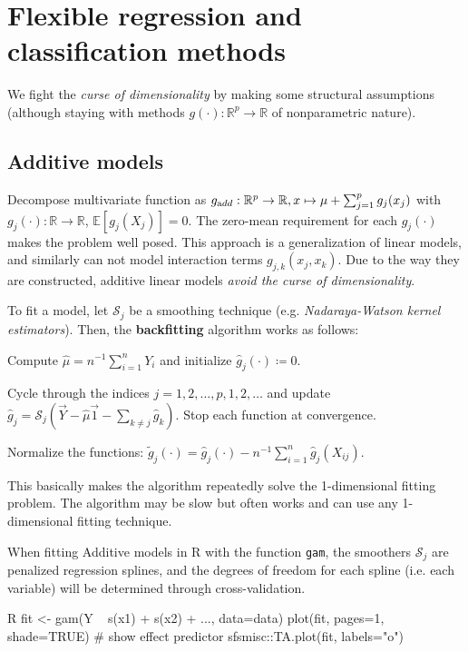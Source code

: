 \section{\Large Flexible regression and classification methods}\label{sec:flexible_regression_and_classification_methods}
We fight the \emph{curse of dimensionality} by making some structural assumptions (although staying with methods $g(\cdot): \mathbb{R}^p \to \mathbb{R}$ of nonparametric nature).
\subsection{Additive models}%
\label{sub:additive_models}
\begin{sectionbox}\nospacing{}
  Decompose multivariate function as $g_{\textrm add}: \mathbb{R}^p\to\mathbb{R}, x\mapsto \mu + \sum_{j=1}^pg_j(x_j)$ with $g_j(\cdot): \mathbb{R}\to\mathbb{R}$, $\mathbb{E}[g_j(X_j)]=0$.
  The zero-mean requirement for each $g_j(\cdot)$ makes the problem well posed.
  This approach is a generalization of linear models, and similarly can not model interaction terms $g_{j,k}(x_j, x_k)$.
  Due to the way they are constructed, additive linear models \emph{avoid the curse of dimensionality}.
\end{sectionbox}
\begin{sectionbox}\nospacing{}
  To fit a model, let $\mathcal{S}_j$ be a smoothing technique (e.g. \emph{Nadaraya-Watson kernel estimators}).
  Then, the \textbf{backfitting} algorithm works as follows:
  \begin{itemizenosep}
    \item Compute $\hat \mu = n^{-1}\sum_{i=1}^n Y_i$ and initialize $\hat g_j(\cdot) \coloneqq 0$.
    \item Cycle through the indices $j = 1,2,\dots,p,1,2,\dots$ and update
      $\hat g_j=\mathcal{S}_j(\vec{Y}-\hat \mu\vec{1}-\sum_{k\neq j}\hat g_k)$.
      Stop each function at convergence.
    \item Normalize the functions: $\tilde g_j(\cdot) = \hat g_j(\cdot) - n^{-1}\sum_{i=1}^n\hat g_j(X_{ij})$.
  \end{itemizenosep}
  This basically makes the algorithm repeatedly solve the 1-dimensional fitting problem.
  The algorithm may be slow but often works and can use any 1-dimensional fitting technique.
\end{sectionbox}
\begin{sectionbox}\nospacing{}
  When fitting Additive models in R with the function \verb!gam!, the smoothers $\mathcal{S}_j$ are penalized regression splines, and the degrees of freedom for each spline (i.e. each variable) will be determined through cross-validation.

  \begin{mintlinebox}{R}
    fit <- gam(Y ~ s(x1) + s(x2) + ..., data=data)
    plot(fit, pages=1, shade=TRUE) # show effect predictor
    sfsmisc::TA.plot(fit, labels="o")
  \end{mintlinebox}
\end{sectionbox}

